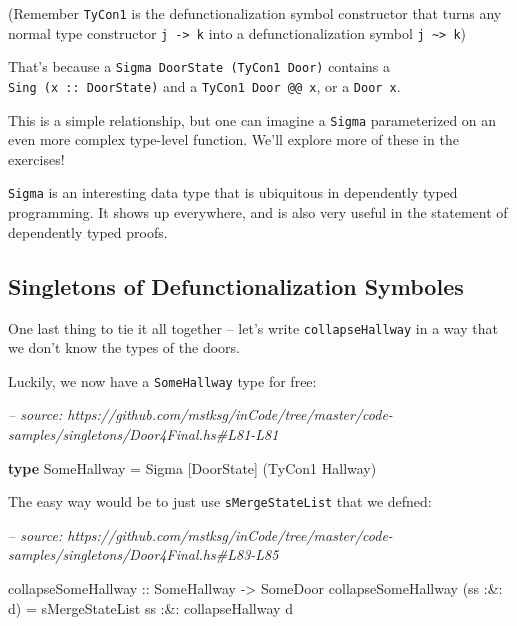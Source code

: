 \documentclass[]{article}
\newenvironment{Shaded}{}{}
\newcommand{\CommentTok}[1]{\textcolor[rgb]{0.38,0.63,0.69}{\textit{#1}}}
\newcommand{\DataTypeTok}[1]{\textcolor[rgb]{0.56,0.13,0.00}{#1}}
\newcommand{\FunctionTok}[1]{\textcolor[rgb]{0.02,0.16,0.49}{#1}}
\newcommand{\KeywordTok}[1]{\textcolor[rgb]{0.00,0.44,0.13}{\textbf{#1}}}
\newcommand{\NormalTok}[1]{#1}
\newcommand{\OtherTok}[1]{\textcolor[rgb]{0.00,0.44,0.13}{#1}}
\begin{document}
(Remember \texttt{TyCon1} is the defunctionalization symbol constructor that
turns any normal type constructor \texttt{j\ -\textgreater{}\ k} into a
defunctionalization symbol \texttt{j\ \textasciitilde{}\textgreater{}\ k})

That's because a \texttt{Sigma\ DoorState\ (TyCon1\ Door)} contains a
\texttt{Sing\ (x\ ::\ DoorState)} and a \texttt{TyCon1\ Door\ @@\ x}, or a
\texttt{Door\ x}.

This is a simple relationship, but one can imagine a \texttt{Sigma}
parameterized on an even more complex type-level function. We'll explore more of
these in the exercises!

\texttt{Sigma} is an interesting data type that is ubiquitous in dependently
typed programming. It shows up everywhere, and is also very useful in the
statement of dependently typed proofs.

\hypertarget{singletons-of-defunctionalization-symboles}{%
\subsection{Singletons of Defunctionalization
Symboles}\label{singletons-of-defunctionalization-symboles}}

One last thing to tie it all together -- let's write \texttt{collapseHallway} in
a way that we don't know the types of the doors.

Luckily, we now have a \texttt{SomeHallway} type for free:

\begin{Shaded}
\begin{Highlighting}[]
\CommentTok{-- source: https://github.com/mstksg/inCode/tree/master/code-samples/singletons/Door4Final.hs#L81-L81}

\KeywordTok{type} \DataTypeTok{SomeHallway} \FunctionTok{=} \DataTypeTok{Sigma}\NormalTok{ [}\DataTypeTok{DoorState}\NormalTok{] (}\DataTypeTok{TyCon1} \DataTypeTok{Hallway}\NormalTok{)}
\end{Highlighting}
\end{Shaded}

The easy way would be to just use \texttt{sMergeStateList} that we defned:

\begin{Shaded}
\begin{Highlighting}[]
\CommentTok{-- source: https://github.com/mstksg/inCode/tree/master/code-samples/singletons/Door4Final.hs#L83-L85}

\OtherTok{collapseSomeHallway ::} \DataTypeTok{SomeHallway} \OtherTok{->} \DataTypeTok{SomeDoor}
\NormalTok{collapseSomeHallway (ss }\FunctionTok{:&:}\NormalTok{ d) }\FunctionTok{=}\NormalTok{ sMergeStateList ss}
                             \FunctionTok{:&:}\NormalTok{ collapseHallway d}
\end{Highlighting}
\end{Shaded}
\end{document}
